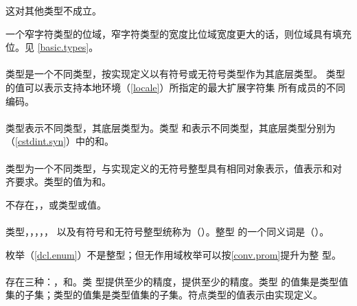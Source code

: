 \begin{note}
  这对其他类型不成立。
\end{note}

\begin{note}
  一个窄字符类型的位域，窄字符类型的宽度比位域宽度更大的话，则位域具有填充位。见
  \ref{basic.types}。
\end{note}

\paragraph{} %
类型是一个不同类型，按实现定义以有符号或无符号类型作为其底层类型。
类型的值可以表示支持本地环境（\ref{locale}）所指定的最大扩展字符集
所有成员的不同编码。

\paragraph{} %
类型表示不同类型，其底层类型为。类型
和表示不同类型，其底层类型分别为
（\ref{cstdint.syn}）中的和。

\paragraph{} %
类型为一个不同类型，与实现定义的无符号整型具有相同对象表示，值表示和对
齐要求。类型的值为和。

\begin{note}
  不存在，，或类型或值。
\end{note}

\paragraph{} %
类型，，，，，
以及有符号和无符号整型统称为（）。整型
的一个同义词是（）。

\begin{note}
  枚举（\ref{dcl.enum}）不是整型；但无作用域枚举可以按\ref{conv.prom}提升为整
  型。
\end{note}

\paragraph{} %
存在三种：，和。类
型提供至少的精度，提供至少的精度。类型
的值集是类型值集的子集；类型的值集是类型值集的子集。符点类型的值表示由实现定义。

